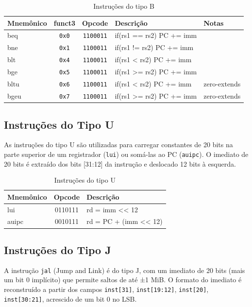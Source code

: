 \documentclass[
	12pt,				%
	oneside,
	a4paper,			%
	english,			%
	french,				%
	spanish,			%
	brazil,				%
	]{abntex2}
\begin{document}
\begin{table}[H]
\centering
\caption{Instruções do tipo B} \label{tab:BType}
\ABNTEXfontereduzida
\begin{tabular}{|l|c|c|l|l|}
\multicolumn{1}{l}{Mnemônico} & \multicolumn{1}{c}{funct3} & \multicolumn{1}{c}{Opcode} & \multicolumn{1}{l}{Descrição} & \multicolumn{1}{l}{Notas} \\ \hline
beq  & \texttt{0x0} & \texttt{1100011} & if(rs1 == rs2) PC += imm & \\ \hline
bne  & \texttt{0x1} & \texttt{1100011} & if(rs1 != rs2) PC += imm & \\ \hline
blt  & \texttt{0x4} & \texttt{1100011} & if(rs1 \textless{} rs2) PC += imm & \\ \hline
bge  & \texttt{0x5} & \texttt{1100011} & if(rs1 \textgreater{}= rs2) PC += imm & \\ \hline
bltu & \texttt{0x6} & \texttt{1100011} & if(rs1 \textless{} rs2) PC += imm & zero-extends \\ \hline
bgeu & \texttt{0x7} & \texttt{1100011} & if(rs1 \textgreater{}= rs2) PC += imm & zero-extends \\ \hline
\end{tabular}
\end{table}

\subsection{Instruções do Tipo U}
As instruções do tipo U são utilizadas para carregar constantes de 20 bits na parte superior de um registrador (\texttt{lui}) ou somá-las ao PC (\texttt{auipc}). O imediato de 20 bits é extraído dos bits [31:12] da instrução e deslocado 12 bits à esquerda.

\begin{table}[H]
\centering
\caption{Instruções do tipo U}
\label{tab:UType}
\begin{tabular}{|l|c|l|}
\hline
Mnemônico & Opcode & Descrição \\ \hline
lui   & 0110111 & rd = imm \textless{}\textless{} 12 \\ \hline
auipc & 0010111 & rd = PC + (imm \textless{}\textless{} 12) \\ \hline
\end{tabular}
\end{table}

\subsection{Instruções do Tipo J}
A instrução \texttt{jal} (Jump and Link) é do tipo J, com um imediato de 20 bits (mais um bit 0 implícito) que permite saltos de até ±1 MiB. O formato do imediato é reconstruído a partir dos campos \texttt{inst[31]}, \texttt{inst[19:12]}, \texttt{inst[20]}, \texttt{inst[30:21]}, acrescido de um bit 0 no LSB.
\end{document}
